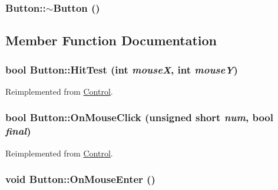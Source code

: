 \hypertarget{class_button_2a001eb9c3cc8ae54768a850dd345002}{
\subsubsection[{$\sim$Button}]{\setlength{\rightskip}{0pt plus 5cm}Button::$\sim$Button ()}}
\label{class_button_2a001eb9c3cc8ae54768a850dd345002}




\subsection{Member Function Documentation}
\hypertarget{class_button_8de2fc8228ff5599b4aaf1ae3db0725f}{
\subsubsection[{HitTest}]{\setlength{\rightskip}{0pt plus 5cm}bool Button::HitTest (int {\em mouseX}, \/  int {\em mouseY})}}
\label{class_button_8de2fc8228ff5599b4aaf1ae3db0725f}




Reimplemented from \hyperlink{class_control_6b586494213774ccc17b161f8ed14888}{Control}.\hypertarget{class_button_cad3e7ea82ecd98781863ae7ab082ce8}{
\subsubsection[{OnMouseClick}]{\setlength{\rightskip}{0pt plus 5cm}bool Button::OnMouseClick (unsigned short {\em num}, \/  bool {\em final})}}
\label{class_button_cad3e7ea82ecd98781863ae7ab082ce8}




Reimplemented from \hyperlink{class_control_1a32f38d1f66f764e6e3a5d8de42d0e0}{Control}.\hypertarget{class_button_69408b048737143eba5ab348e9208405}{
\subsubsection[{OnMouseEnter}]{\setlength{\rightskip}{0pt plus 5cm}void Button::OnMouseEnter ()}}
\label{class_button_69408b048737143eba5ab348e9208405}




